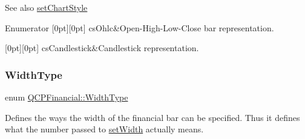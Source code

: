 \begin{DoxySeeAlso}{See also}
\hyperlink{classQCPFinancial_a5a59175d36279d71596e64d7bb65596f}{set\+Chart\+Style} 
\end{DoxySeeAlso}
\begin{DoxyEnumFields}{Enumerator}
[0pt][0pt]{}\mbox{\label{classQCPFinancial_a0f800e21ee98d646dfc6f8f89d10ebfba3a516016c9298d3e95dd82aa203c4390}} 
cs\+Ohlc&Open-\/\+High-\/\+Low-\/\+Close bar representation. \\
\hline

[0pt][0pt]{}\mbox{\label{classQCPFinancial_a0f800e21ee98d646dfc6f8f89d10ebfbac803cbd39f26e3f206bcc7028679e62f}} 
cs\+Candlestick&Candlestick representation. \\
\hline

\end{DoxyEnumFields}
\mbox{\label{classQCPFinancial_aef1761dda71a53dc5269685e9e492626}} 
\subsubsection{\texorpdfstring{Width\+Type}{WidthType}}
{\footnotesize\ttfamily enum \hyperlink{classQCPFinancial_aef1761dda71a53dc5269685e9e492626}{Q\+C\+P\+Financial\+::\+Width\+Type}}

Defines the ways the width of the financial bar can be specified. Thus it defines what the number passed to \hyperlink{classQCPFinancial_a99633f8bac86a61d534ae5eeb1a3068f}{set\+Width} actually means.

